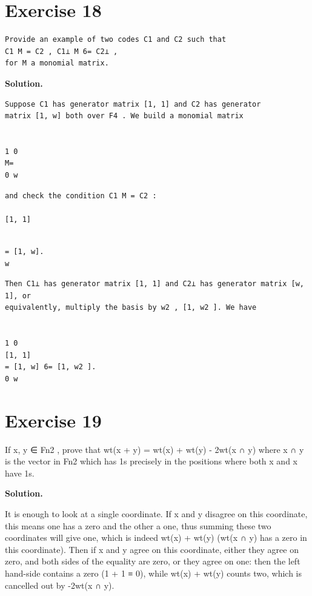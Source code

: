 \documentclass[11pt]{article}
\begin{document}
\section*{Exercise 18}
\begin{exercisebox}
\begin{Verbatim}[fontsize=\small]
Provide an example of two codes C1 and C2 such that
C1 M = C2 , C1⊥ M 6= C2⊥ ,
for M a monomial matrix.
\end{Verbatim}
\end{exercisebox}
\begin{solutionbox}
\textbf{Solution.}

\begin{Verbatim}[fontsize=\small]
Suppose C1 has generator matrix [1, 1] and C2 has generator
matrix [1, w] both over F4 . We build a monomial matrix


1 0
M=
0 w
\end{Verbatim}
\begin{Verbatim}[fontsize=\small]
and check the condition C1 M = C2 :

[1, 1]
\end{Verbatim}
\begin{Verbatim}[fontsize=\small]

= [1, w].
w
\end{Verbatim}
\begin{Verbatim}[fontsize=\small]
Then C1⊥ has generator matrix [1, 1] and C2⊥ has generator matrix [w, 1], or
equivalently, multiply the basis by w2 , [1, w2 ]. We have


1 0
[1, 1]
= [1, w] 6= [1, w2 ].
0 w
\end{Verbatim}
\end{solutionbox}
\section*{Exercise 19}
\begin{exercisebox}
If x, y ∈ Fn2 , prove that wt(x + y) = wt(x) + wt(y) - 2wt(x ∩ y) where x ∩ y is the vector in Fn2 which has 1s precisely in the positions where both x and x have 1s.

\end{exercisebox}
\begin{solutionbox}
\textbf{Solution.}

It is enough to look at a single coordinate. If x and y disagree on this coordinate, this means one has a zero and the other a one, thus summing these two coordinates will give one, which is indeed wt(x) + wt(y) (wt(x ∩ y) has a zero in this coordinate). Then if x and y agree on this coordinate, either they agree on zero, and both sides of the equality are zero, or they agree on one: then the left hand-side contains a zero (1 + 1 ≡ 0), while wt(x) + wt(y) counts two, which is cancelled out by -2wt(x ∩ y).

\end{solutionbox}
\end{document}
